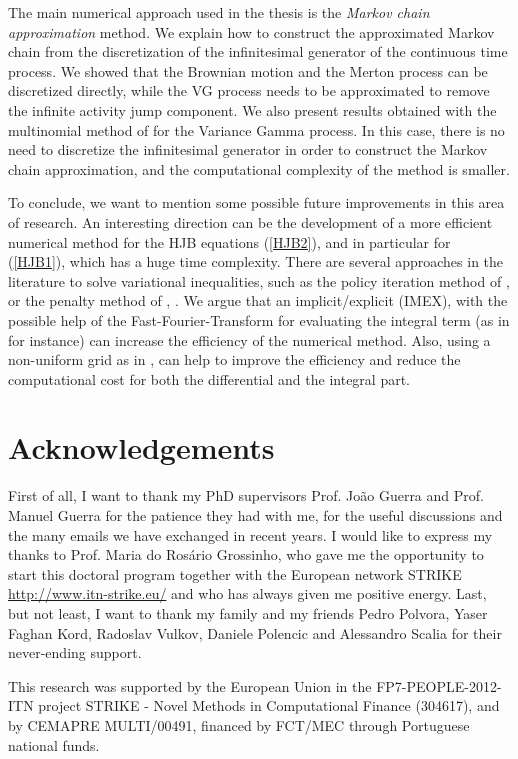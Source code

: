 The main numerical approach used in the thesis is the \emph{Markov chain approximation} method. We explain how to construct the approximated Markov chain from the 
discretization of the infinitesimal generator of the continuous time process.
We showed that the Brownian motion and the Merton process can be discretized directly, 
while the VG process needs to be approximated to remove the infinite activity jump component.
We also present results obtained with the multinomial method of \cite{YaPr01} for the Variance Gamma process. In this case, there is no need to discretize the infinitesimal
generator in order to construct the Markov chain approximation, and the computational complexity of the method is smaller. 


To conclude, we want to mention some possible future improvements in this area of research. 
An interesting direction can be the development of a more efficient numerical method for the HJB equations (\ref{HJB2}), and in particular for (\ref{HJB1}), 
which has a huge time complexity.
There are several approaches in the literature to solve variational inequalities, such as the policy iteration method of \cite{FoHu12a}, or the penalty method of 
\cite{FoHu12b}, \cite{Song14}.
We argue that an implicit/explicit (IMEX), with the possible help of the Fast-Fourier-Transform for evaluating the integral term (as in \cite{AnAn00} for instance) 
can increase the efficiency of the numerical method.
Also, using a non-uniform grid as in \cite{Haentjens13}, can help to improve the efficiency 
and reduce the computational cost for both the differential and the integral part.






\section*{Acknowledgements}

First of all, I want to thank my PhD supervisors Prof. João Guerra and Prof. Manuel Guerra for the
patience they had with me, for the useful discussions and the many emails we have exchanged in recent years.
I would like to express my thanks to Prof. Maria do Rosário Grossinho, who gave me the opportunity to start
this doctoral program together with the European network STRIKE \url{http://www.itn-strike.eu/} and who has always 
given me positive energy.
Last, but not least, I want to thank my family and my friends Pedro Polvora, Yaser Faghan Kord, Radoslav Vulkov, 
Daniele Polencic and Alessandro Scalia for their never-ending support.

This research was supported by the European Union in the FP7-PEOPLE-2012-ITN project STRIKE - 
Novel Methods in Computational Finance (304617), and by CEMAPRE
MULTI/00491, financed by FCT/MEC through Portuguese national funds.
